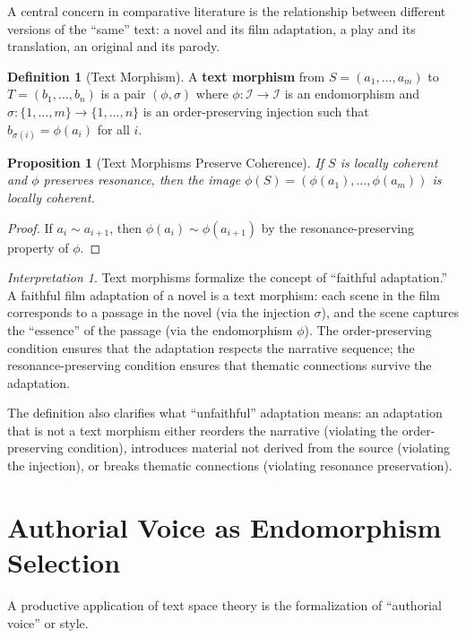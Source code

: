 \documentclass[11pt,openany]{book}
\theoremstyle{definition}
\newtheorem{definition}[axiom]{Definition}
\theoremstyle{plain}
\newtheorem{proposition}[axiom]{Proposition}
\theoremstyle{remark}
\newtheorem{interpretation}[axiom]{Interpretation}
\newcommand{\IS}{\mathcal{I}}               %
\newcommand{\res}{\sim}                      %
\begin{document}
A central concern in comparative literature is the relationship between different versions of the ``same'' text: a novel and its film adaptation, a play and its translation, an original and its parody.

\begin{definition}[Text Morphism]
A \textbf{text morphism} from $S = (a_1, \ldots, a_m)$ to $T = (b_1, \ldots, b_n)$ is a pair $(\phi, \sigma)$ where $\phi : \IS \to \IS$ is an endomorphism and $\sigma : \{1, \ldots, m\} \to \{1, \ldots, n\}$ is an order-preserving injection such that $b_{\sigma(i)} = \phi(a_i)$ for all $i$.
\end{definition}

\begin{proposition}[Text Morphisms Preserve Coherence]
If $S$ is locally coherent and $\phi$ preserves resonance, then the image $\phi(S) = (\phi(a_1), \ldots, \phi(a_m))$ is locally coherent.
\end{proposition}

\begin{proof}
If $a_i \res a_{i+1}$, then $\phi(a_i) \res \phi(a_{i+1})$ by the resonance-preserving property of $\phi$.
\end{proof}

\begin{interpretation}
Text morphisms formalize the concept of ``faithful adaptation.'' A faithful film adaptation of a novel is a text morphism: each scene in the film corresponds to a passage in the novel (via the injection $\sigma$), and the scene captures the ``essence'' of the passage (via the endomorphism $\phi$). The order-preserving condition ensures that the adaptation respects the narrative sequence; the resonance-preserving condition ensures that thematic connections survive the adaptation.

The definition also clarifies what ``unfaithful'' adaptation means: an adaptation that is not a text morphism either reorders the narrative (violating the order-preserving condition), introduces material not derived from the source (violating the injection), or breaks thematic connections (violating resonance preservation).
\end{interpretation}

\section{Authorial Voice as Endomorphism Selection}

A productive application of text space theory is the formalization of ``authorial voice'' or style.
\end{document}
